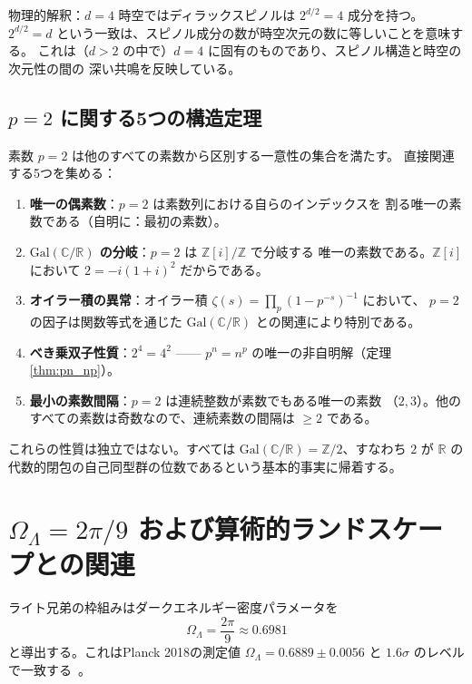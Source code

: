 \documentclass[12pt,a4paper]{article}
\theoremstyle{definition}
\newcommand{\Gal}{\mathrm{Gal}}
\newcommand{\ZZ}{\mathbb{Z}}
\newcommand{\RR}{\mathbb{R}}
\newcommand{\CC}{\mathbb{C}}
\begin{document}
物理的解釈：$d=4$ 時空ではディラックスピノルは $2^{d/2} = 4$ 成分を持つ。
$2^{d/2} = d$ という一致は、スピノル成分の数が時空次元の数に等しいことを意味する。
これは（$d > 2$ の中で）$d=4$ に固有のものであり、スピノル構造と時空の次元性の間の
深い共鳴を反映している。

\subsection{$p=2$ に関する5つの構造定理}

素数 $p=2$ は他のすべての素数から区別する一意性の集合を満たす。
直接関連する5つを集める：

\begin{enumerate}
  \item \textbf{唯一の偶素数}：$p=2$ は素数列における自らのインデックスを
    割る唯一の素数である（自明に：最初の素数）。
  \item \textbf{$\Gal(\CC/\RR)$ の分岐}：$p=2$ は $\ZZ[i]/\ZZ$ で分岐する
    唯一の素数である。$\ZZ[i]$ において $2 = -i(1+i)^2$ だからである。
  \item \textbf{オイラー積の異常}：オイラー積
    $\zeta(s) = \prod_p (1 - p^{-s})^{-1}$ において、
    $p=2$ の因子は関数等式を通じた $\Gal(\CC/\RR)$ との関連により特別である。
  \item \textbf{べき乗双子性質}：$2^4 = 4^2$ ——
    $p^n = n^p$ の唯一の非自明解（定理\ref{thm:pn_np}）。
  \item \textbf{最小の素数間隔}：$p=2$ は連続整数が素数でもある唯一の素数
    （$2, 3$）。他のすべての素数は奇数なので、連続素数の間隔は $\geq 2$ である。
\end{enumerate}

これらの性質は独立ではない。すべては $\Gal(\CC/\RR) = \ZZ/2$、すなわち
$2$ が $\RR$ の代数的閉包の自己同型群の位数であるという基本的事実に帰着する。

\section{$\Omega_\Lambda = 2\pi/9$ および算術的ランドスケープとの関連}\label{sec:omega}

ライト兄弟の枠組みはダークエネルギー密度パラメータを
\[
  \Omega_\Lambda = \frac{2\pi}{9} \approx 0.6981
\]
と導出する。これはPlanck 2018の測定値 $\Omega_\Lambda = 0.6889 \pm 0.0056$ と
$1.6\sigma$ のレベルで一致する~\cite{Planck2018}。
\end{document}
